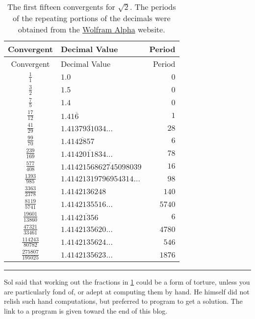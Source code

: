 \documentclass[
  a4paper,
]{article}
\begin{document}
\begin{longtable}[]{@{}clr@{}}
\caption{\label{tbl:sqrt2convergents}The first fifteen convergents for
\(\sqrt{2}\). The periods of the repeating portions of the decimals were
obtained from the \href{https://www.wolframalpha.com}{Wolfram Alpha}
website.}\tabularnewline
\toprule\noalign{}
Convergent & Decimal Value & Period \\
\midrule\noalign{}
\endfirsthead
\toprule\noalign{}
Convergent & Decimal Value & Period \\
\midrule\noalign{}
\endhead
\bottomrule\noalign{}
\endlastfoot
\(\frac{1}{1}\) & \(1.0\) & \(0\) \\
\(\frac{3}{2}\) & \(1.5\) & \(0\) \\
\(\frac{7}{5}\) & \(1.4\) & \(0\) \\
\(\frac{17}{12}\) & \(1.41\overline{6}\) & \(1\) \\
\(\frac{41}{29}\) & \(1.\overline{4137931034\dots}\) & \(28\) \\
\(\frac{99}{70}\) & \(1.4\overline{142857}\) & \(6\) \\
\(\frac{239}{169}\) & \(1.\overline{4142011834\dots}\) & \(78\) \\
\(\frac{577}{408}\) & \(1.414\overline{2156862745098039}\) & \(16\) \\
\(\frac{1393}{985}\) & \(1.41421319796954314\dots\) & \(98\) \\
\(\frac{3363}{2378}\) & \(1.4142136248\) & \(140\) \\
\(\frac{8119}{5741}\) & \(1.4142135516\dots\) & \(5740\) \\
\(\frac{19601}{13860}\) & \(1.41\overline{421356}\) & \(6\) \\
\(\frac{47321}{33461}\) & \(1.4142135620\dots\) & \(4780\) \\
\(\frac{114243}{80782}\) & \(1.4142135624\dots\) & \(546\) \\
\(\frac{275807}{195025}\) & \(1.4142135623\dots\) & \(1876\) \\
\end{longtable}

\begin{center}\rule{0.5\linewidth}{0.5pt}\end{center}

Sol said that working out the fractions in \cref{tbl:sqrt2convergents}
could be a form of torture, unless you are particularly fond of, or
adept at computing them by hand. He himself did not relish such hand
computations, but preferred to program to get a solution. The link to a
program is given toward the end of this blog.
\end{document}
